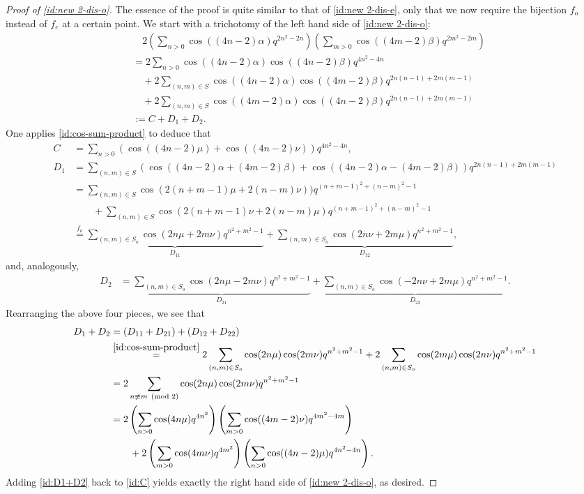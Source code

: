 \documentclass[11pt,reqno]{amsart}
\numberwithin{equation}{section}
\theoremstyle{plain}
\theoremstyle{definition}
\theoremstyle{named}
\begin{document}
\begin{proof}[Proof of \eqref{id:new 2-dis-o}]
The essence of the proof is quite similar to that of \eqref{id:new 2-dis-e}, only that we now require the bijection $f_o$ instead of $f_e$ at a certain point. We start with a trichotomy of the left hand side of \eqref{id:new 2-dis-o}:
\begin{align*}
&\quad 2\left(\sum_{n>0}\cos((4n-2)\alpha)q^{2n^2-2n}\right)\left(\sum_{m>0}\cos((4m-2)\beta)q^{2m^2-2m}\right)\\
&= 2\sum_{n>0}\cos((4n-2)\alpha)\cos((4n-2)\beta)q^{4n^2-4n}\\
&\quad +2\sum_{(n,m)\in S}\cos((4n-2)\alpha)\cos((4m-2)\beta)q^{2n(n-1)+2m(m-1)}\\
&\quad +2\sum_{(n,m)\in S}\cos((4m-2)\alpha)\cos((4n-2)\beta)q^{2n(n-1)+2m(m-1)}\\
&:=C+D_1+D_2.
\end{align*}
One applies \eqref{id:cos-sum-product} to deduce that
\begin{align}
C &= \sum_{n>0}(\cos((4n-2)\mu)+\cos((4n-2)\nu))q^{4n^2-4n},\label{id:C}\\
D_1 &= \sum_{(n,m)\in S}(\cos((4n-2)\alpha+(4m-2)\beta)+\cos((4n-2)\alpha-(4m-2)\beta))q^{2n(n-1)+2m(m-1)}\nonumber \\
&= \sum_{(n,m)\in S}\cos(2(n+m-1)\mu+2(n-m)\nu))q^{(n+m-1)^2+(n-m)^2-1} \nonumber \\
&\qquad +\sum_{(n,m)\in S}\cos(2(n+m-1)\nu+2(n-m)\mu)q^{(n+m-1)^2+(n-m)^2-1}\nonumber \\
&\stackrel{f_o}{=}\underbrace{\sum_{(n,m)\in S_o}\cos(2n\mu+2m\nu)q^{n^2+m^2-1}}_{D_{11}}+\underbrace{\sum_{(n,m)\in S_o}\cos(2n\nu+2m\mu)q^{n^2+m^2-1}}_{D_{12}},\nonumber
\end{align}
and, analogously,
\begin{align*}
D_2 &= \underbrace{\sum_{(n,m)\in S_o}\cos(2n\mu-2m\nu)q^{n^2+m^2-1}}_{D_{21}}+\underbrace{\sum_{(n,m)\in S_o}\cos(-2n\nu+2m\mu)q^{n^2+m^2-1}}_{D_{22}}.\nonumber 
\end{align*}
Rearranging the above four pieces, we see that
\begin{align}
D_1+D_2 &= (D_{11}+D_{21})+(D_{12}+D_{22})\nonumber \\
&\stackrel{\eqref{id:cos-sum-product}}{=}2\sum_{(n,m)\in S_o}\cos(2n\mu)\cos(2m\nu)q^{n^2+m^2-1}+2\sum_{(n,m)\in S_o}\cos(2m\mu)\cos(2n\nu)q^{n^2+m^2-1}\nonumber \\
&= 2\sum_{n\not\equiv m\pmod 2}\cos(2n\mu)\cos(2m\nu)q^{n^2+m^2-1}\nonumber \\
&= 2\left(\sum_{n>0}\cos(4n\mu)q^{4n^2}\right)\left(\sum_{m>0}\cos((4m-2)\nu)q^{4m^2-4m}\right)\nonumber \\
&\qquad +2\left(\sum_{m>0}\cos(4m\nu)q^{4m^2}\right)\left(\sum_{n>0}\cos((4n-2)\mu)q^{4n^2-4n}\right)\label{id:D1+D2}.
\end{align}
Adding \eqref{id:D1+D2} back to \eqref{id:C} yields exactly the right hand side of \eqref{id:new 2-dis-o}, as desired.
\end{proof}
\end{document}
